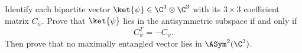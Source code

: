 Identify each bipartite vector $\ket{\psi}\in\C^3\otimes\C^3$ with its $3\times3$ coefficient matrix $C_\psi$. Prove that $\ket{\psi}$ lies in the antisymmetric subspace if and only if
$$
C_\psi^T=-C_\psi.
$$
Then prove that no maximally entangled vector lies in $\ASym^2(\C^3)$.
